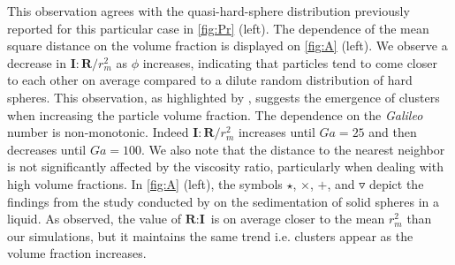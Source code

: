 This observation agrees with the quasi-hard-sphere distribution previously reported for this particular case in \ref{fig:Pr} (left).
The dependence of the mean square distance on the volume fraction is displayed on \ref{fig:A} (left). 
We observe a decrease in $\textbf{I}:\textbf{R}/r_m^2$ as $\phi$ increases, indicating that particles tend to come closer to each other on average compared to a dilute random distribution of hard spheres. 
This observation, as highlighted by \citet{zhang2023evolution}, suggests the emergence of clusters when increasing the particle volume fraction. 
The dependence on the \textit{Galileo} number is non-monotonic. 
Indeed $\textbf{I}:\textbf{R}/r_m^2$ increases until $Ga = 25$ and then decreases until $Ga = 100$. We also note that the distance to the nearest neighbor is not significantly affected by the viscosity ratio, particularly when dealing with high volume fractions. 
In \ref{fig:A} (left), the symbols $\pmb\star$, $\pmb\times$, $\pmb +$, and $\pmb\triangledown$ depict the findings from the study conducted by \citet{zhang2023evolution} on the sedimentation of solid spheres in a liquid.
As observed, the value of $\textbf{R}:\textbf{I}$ is on average closer to the mean $r_m^2$ than our simulations, but it maintains the same trend i.e. clusters appear as the volume fraction increases.

